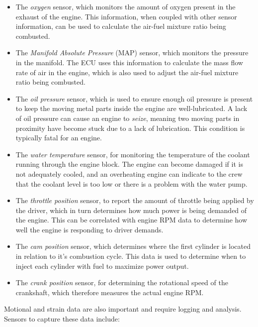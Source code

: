 \begin{itemize}

\item The \emph{oxygen} sensor, which monitors the amount of oxygen present in the exhaust of the engine. This information, when coupled with other sensor information, can be used to calculate the air-fuel mixture ratio being combusted.

\item The \emph{Manifold Absolute Pressure} (MAP) sensor, which monitors the pressure in the manifold. The ECU uses this information to calculate the mass flow rate of air in the engine, which is also used to adjust the air-fuel mixture ratio being combusted.

\item The \emph{oil pressure} sensor, which is used to ensure enough oil pressure is present to keep the moving metal parts inside the engine are well-lubricated. A lack of oil pressure can cause an engine to \emph{seize}, meaning two moving parts in proximity have become stuck due to a lack of lubrication. This condition is typically fatal for an engine.

\item The \emph{water temperature} sensor, for monitoring the temperature of the coolant running through the engine block. The engine can become damaged if it is not adequately cooled, and an overheating engine can indicate to the crew that the coolant level is too low or there is a problem with the water pump.

\item The \emph{throttle position} sensor, to report the amount of throttle being applied by the driver, which in turn determines how much power is being demanded of the engine. This can be correlated with engine RPM data to determine how well the engine is responding to driver demands.

\item The \emph{cam position} sensor, which determines where the first cylinder is located in relation to it's combustion cycle. This data is used to determine when to inject each cylinder with fuel to maximize power output.

\item The \emph{crank position} sensor, for determining the rotational speed of the crankshaft, which therefore measures the actual engine RPM. 

\end{itemize}

Motional and strain data are also important and require logging and analysis. Sensors to capture these data include:

